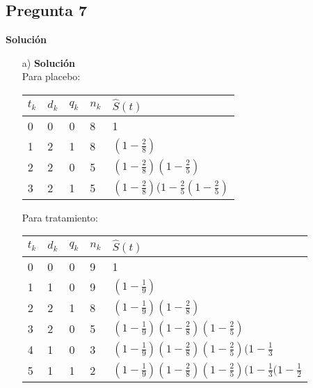 \documentclass[10pt]{article}\usepackage[]{graphicx}\usepackage[]{color}
\begin{document}
{\subsection*{Pregunta 7} \textbf{Solución}\\ 
\begin{itemize}
\item[a)] \textbf{Solución}\\ 

Para placebo:

\begin{center}
\begin{tabular}{|l|l|l|l|l|}
\hline
$t_{k}$ & $d_{k}$& $q_{k}$ & $n_{k}$ & $\hat{S}(t)$\\
\hline
0 & 0 & 0& 8 & 1\\
\hline
1 & 2 & 1 & 8 & $(1-\frac{2}{8})$\\
\hline
2&2&0&5&$(1-\frac{2}{8})(1-\frac{2}{5})$\\
\hline 
3&2&1&5&$(1-\frac{2}{8})(1-\frac{2}{5}(1-\frac{2}{5})$\\
\hline
\end{tabular}
\end{center}

Para tratamiento:

\begin{center}
\begin{tabular}{|l|l|l|l|l|}
\hline
$t_{k}$ & $d_{k}$& $q_{k}$ & $n_{k}$ & $\hat{S}(t)$\\
\hline
0 & 0 & 0& 9 & 1\\
\hline
1&1&0&9&$(1-\frac{1}{9})$\\
\hline
2&2&1&8&$(1-\frac{1}{9})(1-\frac{2}{8})$\\
\hline
3&2&0&5&$(1-\frac{1}{9})(1-\frac{2}{8})(1-\frac{2}{5})$\\
\hline
4&1&0&3&$(1-\frac{1}{9})(1-\frac{2}{8})(1-\frac{2}{5})(1-\frac{1}{3}$\\
\hline
5&1&1&2& $(1-\frac{1}{9})(1-\frac{2}{8})(1-\frac{2}{5})(1-\frac{1}{3}(1-\frac{1}{2}$\\
\hline
\end{tabular}
\end{center}


\end{itemize}}
\end{document}
